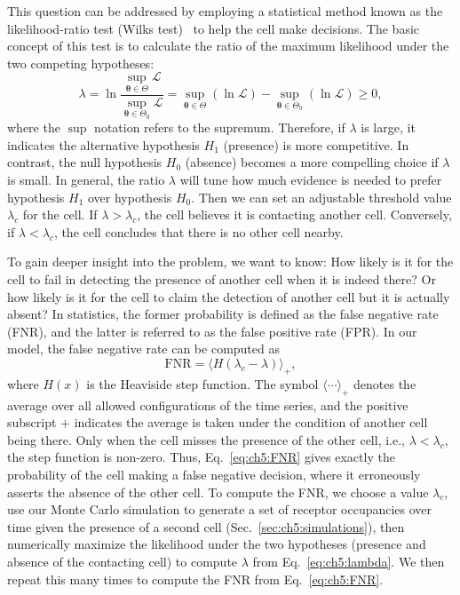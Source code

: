 This question can be addressed by employing a statistical method known as the likelihood-ratio test (Wilks test)~\cite{li2019graduate} to help the cell make decisions.
The basic concept of this test is to calculate the ratio of the maximum likelihood under the two competing hypotheses:
\begin{equation} \label{eq:ch5:lambda}
    \lambda = \ln\frac{\sup_{\boldsymbol{\theta}\in\Theta}\mathcal{L}}{\sup_{\boldsymbol{\theta}\in\Theta_0}\mathcal{L}}=\sup_{\boldsymbol{\theta}\in\Theta}(\ln\mathcal{L})-\sup_{\boldsymbol{\theta}\in\Theta_0}(\ln\mathcal{L})\geqslant0,
\end{equation}
where the $\sup$ notation refers to the supremum.
Therefore, if $\lambda$ is large, it indicates the alternative hypothesis $H_1$ (presence) is more competitive.
In contrast, the null hypothesis $H_0$ (absence) becomes a more compelling choice if $\lambda$ is small.
In general, the ratio $\lambda$ will tune how much evidence is needed to prefer hypothesis $H_1$ over hypothesis $H_0$.
Then we can set an adjustable threshold value $\lambda_c$ for the cell.
If $\lambda>\lambda_c$, the cell believes it is contacting another cell.
Conversely, if $\lambda < \lambda_c$, the cell concludes that there is no other cell nearby.

To gain deeper insight into the problem, we want to know: How likely is it for the cell to fail in detecting the presence of another cell when it is indeed there?
Or how likely is it for the cell to claim the detection of another cell but it is actually absent?
In statistics, the former probability is defined as the false negative rate (FNR), and the latter is referred to as the false positive rate (FPR).
In our model, the false negative rate can be computed as~\cite{mora2015physical}
\begin{equation}\label{eq:ch5:FNR}
\textrm{FNR}=\langle H(\lambda_c-\lambda)\rangle_+,
\end{equation}
where $H(x)$ is the Heaviside step function.
The symbol $\langle\cdots\rangle_+$ denotes the average over all allowed configurations of the time series, and the positive subscript $+$ indicates the average is taken under the condition of another cell being there.
Only when the cell misses the presence of the other cell, i.e., $\lambda<\lambda_c$, the step function is non-zero.
Thus, Eq.~\eqref{eq:ch5:FNR} gives exactly the probability of the cell making a false negative decision, where it erroneously asserts the absence of the other cell.
To compute the FNR, we choose a value $\lambda_c$, use our Monte Carlo simulation to generate a set of receptor occupancies over time given the presence of a second cell (Sec.~\ref{sec:ch5:simulations}), then numerically maximize the likelihood under the two hypotheses (presence and absence of the contacting cell) to compute $\lambda$ from Eq.~\eqref{eq:ch5:lambda}.
We then repeat this many times to compute the FNR from Eq.~\eqref{eq:ch5:FNR}.

